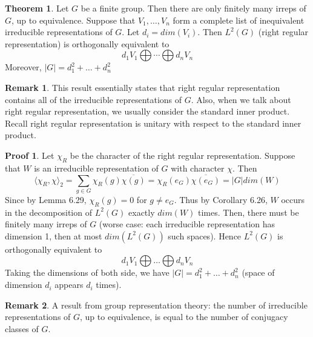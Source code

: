 \documentclass{book}
\newcommand{\inner}[1]{\langle #1 \rangle}
\newcommand{\abs}[1]{\lvert #1 \rvert }
\theoremstyle{definition}
\newtheorem{theorem}[lemma]{Theorem}
\theoremstyle{remarkstyle}
\newtheorem*{remark}{Remark}%
\newtheorem*{myproof}{Proof}%
\begin{document}
\begin{theorem}
    Let $G$ be a finite group. Then there are only finitely many irreps of $G$, up to equivalence. Suppose that $V_1,\dots,V_n$ form a complete list of inequivalent irreducible representations of $G$. Let $d_i=dim(V_i)$. Then $L^2(G)$ (right regular representation) is orthogonally equivalent to 
    $$
    d_1V_1\bigoplus\cdots\bigoplus d_nV_n
    $$
    Moreover, $\abs{G}=d_1^2+\dots+d_n^2$
\end{theorem}
\begin{remark}
    This result essentially states that right regular representation contains all of the irreducible representations of $G$. Also, when we talk about right regular representation, we usually consider the standard inner product. Recall right regular representation is unitary with respect to the standard inner product.
\end{remark}
\begin{myproof}
    Let $\chi_R$ be the character of the right regular representation. Suppose that $W$ is an irreducible representation of $G$ with character $\chi$. Then
    $$
    \inner{\chi_R,\chi}_2 = \sum_{g\in G}\chi_R(g)\overline{\chi(g)} = \chi_R(e_G)\overline{\chi(e_G)} = \abs{G}dim(W)
    $$
    Since by Lemma 6.29, $\chi_R(g)=0$ for $g\neq e_G$. Thus by Corollary 6.26, $W$ occurs in the decomposition of $L^2(G)$ exactly $dim(W)$ times. Then, there must be finitely many irreps of $G$ (worse case: each irreducible representation has dimension 1, then at most $dim(L^2(G))$ such spaces). Hence $L^2(G)$ is orthogonally equivalent to
    $$
    d_1V_1\bigoplus\dots\bigoplus d_nV_n
    $$
    Taking the dimensions of both side, we have $\abs{G}=d_1^2+\dots+d_n^2$ (space of dimension $d_i$ appears $d_i$ times).
\end{myproof}
\begin{remark}
    A result from group representation theory: the number of irreducible representations of $G$, up to equivalence, is equal to the number of conjugacy classes of $G$. \newline
\end{remark}
\end{document}
